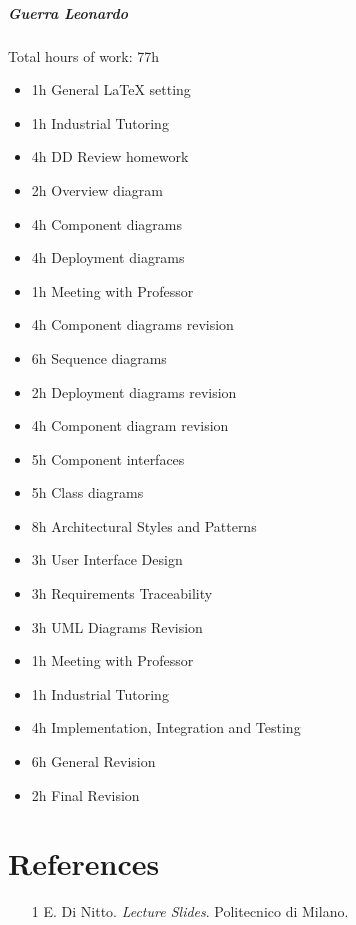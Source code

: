 \documentclass{report}
\newcommand{\ic}[1]{\textit{#1}}
\begin{document}
		\paragraph{Guerra Leonardo} Total hours of work: 77h
			\begin{itemize}
				\item 1h General LaTeX setting
				\item 1h Industrial Tutoring
				\item 4h DD Review homework
				\item 2h Overview diagram
				\item 4h Component diagrams
				\item 4h Deployment diagrams
				\item 1h Meeting with Professor
				\item 4h Component diagrams revision
				\item 6h Sequence diagrams
				\item 2h Deployment diagrams revision
				\item 4h Component diagram revision
				\item 5h Component interfaces
				\item 5h Class diagrams
				\item 8h Architectural Styles and Patterns
				\item 3h User Interface Design
				\item 3h Requirements Traceability
				\item 3h UML Diagrams Revision
				\item 1h Meeting with Professor
				\item 1h Industrial Tutoring
				\item 4h Implementation, Integration and Testing
				\item 6h General Revision
				\item 2h Final Revision
				
			\end{itemize}
	\chapter{References}
	\thispagestyle{fancy}
	\begin{itemize}
				\item[1]E. Di Nitto. \ic{Lecture Slides}. Politecnico di Milano.
	\end{itemize}
	
\end{document}
